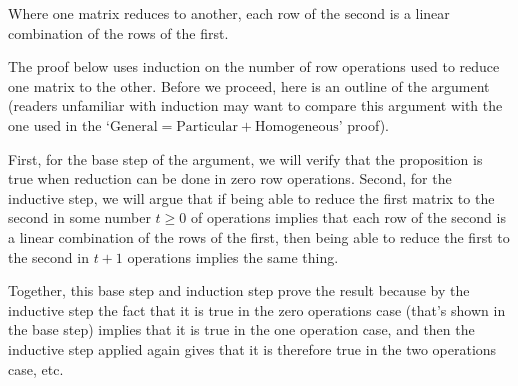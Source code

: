 \begin{corollary} \label{cor:RowsOfEqMatsLinCombos}
Where one matrix reduces to another, each row of the second
is a linear combination of the rows of the first.
\end{corollary}

The proof below uses induction on the number of row operations used to
reduce one matrix to the other.
Before we proceed, here is an outline of the argument
(readers unfamiliar with induction may want to compare this argument with the
one used in the 
`$\text{General}=\text{Particular}+\text{Homogeneous}$' 
proof). %

First, for the base step of the argument, we
will verify that the proposition is true when reduction 
can be done in zero row operations.
Second, for the inductive step, we will 
argue that if being able to reduce the first matrix to the second in some
number $t\geq 0$ of operations implies that each row of the second is a linear
combination of the rows of the first, then being able to reduce the first to
the second in $t+1$ operations implies the same thing.

Together, this base step and induction step prove the result because  
by the inductive step the fact that it is true in the zero operations case
(that's shown in the base step)
implies that it is true in the one operation case, and then the inductive step
applied again gives that it is therefore true in the two operations case, etc.

